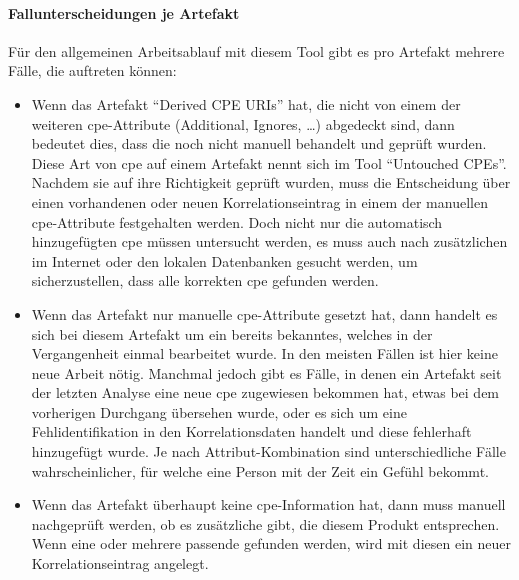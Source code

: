 
\paragraph{Fallunterscheidungen je Artefakt}
Für den allgemeinen Arbeitsablauf mit diesem Tool gibt es pro Artefakt mehrere Fälle, die auftreten können:

\begin{itemize}
    \item Wenn das Artefakt \enquote{Derived CPE URIs} hat, die nicht von einem der weiteren \acrshort{cpe}-Attribute (Additional, Ignores, \ldots) abgedeckt sind, dann bedeutet dies, dass die  noch nicht manuell behandelt und geprüft wurden.
    Diese Art von \acrshort{cpe} auf einem Artefakt nennt sich im Tool \enquote{Untouched CPEs}.
    Nachdem sie auf ihre Richtigkeit geprüft wurden, muss die Entscheidung über einen vorhandenen oder neuen Korrelationseintrag in einem der manuellen \acrshort{cpe}-Attribute festgehalten werden.
    Doch nicht nur die automatisch hinzugefügten \acrshort{cpe} müssen untersucht werden, es muss auch nach zusätzlichen  im Internet oder den lokalen Datenbanken gesucht werden, um sicherzustellen, dass alle korrekten \acrshort{cpe} gefunden werden.

    \item Wenn das Artefakt nur manuelle \acrshort{cpe}-Attribute gesetzt hat, dann handelt es sich bei diesem Artefakt um ein bereits bekanntes, welches in der Vergangenheit einmal bearbeitet wurde.
    In den meisten Fällen ist hier keine neue Arbeit nötig.
    Manchmal jedoch gibt es Fälle, in denen ein Artefakt seit der letzten Analyse eine neue \acrshort{cpe} zugewiesen bekommen hat, etwas bei dem vorherigen Durchgang übersehen wurde, oder es sich um eine Fehlidentifikation in den Korrelationsdaten handelt und diese fehlerhaft hinzugefügt wurde.
    Je nach Attribut-Kombination sind unterschiedliche Fälle wahrscheinlicher, für welche eine Person mit der Zeit ein Gefühl bekommt.

    \item Wenn das Artefakt überhaupt keine \acrshort{cpe}-Information hat, dann muss manuell nachgeprüft werden, ob es zusätzliche gibt, die diesem Produkt entsprechen.
    Wenn eine oder mehrere passende gefunden werden, wird mit diesen ein neuer Korrelationseintrag angelegt.
\end{itemize}

